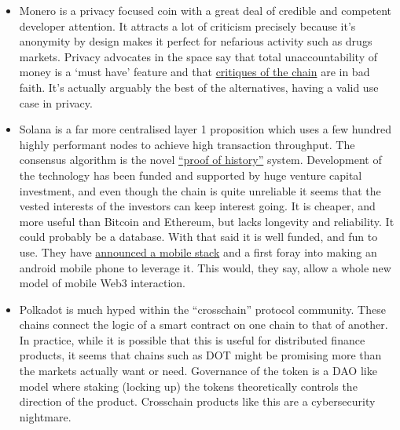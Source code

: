 \begin{itemize}
\item Monero is a privacy focused coin with a great deal of credible and competent developer attention. It attracts a lot of criticism precisely because it's anonymity by design makes it perfect for nefarious activity such as drugs markets. Privacy advocates in the space say that total unaccountability of money is a `must have' feature and that \href{https://sethforprivacy.com/posts/dispelling-monero-fud/#introduction}{critiques of the chain} are in bad faith. It's actually arguably the best of the alternatives, having a valid use case  in privacy.
\item Solana is a far more centralised layer 1 proposition which uses a few hundred highly performant nodes to achieve high transaction throughput. The consensus algorithm is the novel \href{https://solana.com/solana-whitepaper.pdf}{``proof of history''} system. Development of the technology has been funded and supported by huge venture capital investment, and even though the chain is quite unreliable it seems that the vested interests of the investors can keep interest going. It is cheaper, and more useful than Bitcoin and Ethereum, but lacks longevity and reliability. It could probably be a database. With that said it is well funded, and fun to use. They have \href{https://solana.com/news/solana-mobile-stack-reveal}{announced a mobile stack} and a first foray into making an android mobile phone to leverage it. This would, they say, allow a whole new model of mobile Web3 interaction.
\item Polkadot is much hyped within the ``crosschain'' protocol community. These chains connect the logic of a smart contract on one chain to that of another. In practice, while it is possible that this is useful for distributed finance products, it seems that chains such as DOT might be promising more than the markets actually want or need. Governance of the token is a DAO like model where staking (locking up) the tokens theoretically controls the direction of the product. Crosschain products like this are a cybersecurity nightmare.

\end{itemize}
